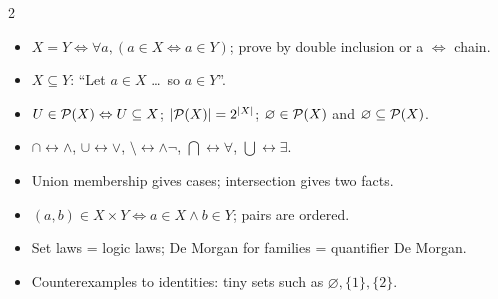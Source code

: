 
\begin{multicols}{2}\small
\begin{itemize}
\item $X=Y\Leftrightarrow\forall a,(a\in X\Leftrightarrow a\in Y)$; prove by double inclusion or a $\Leftrightarrow$ chain.
\item $X\subseteq Y$: ``Let $a\in X$ \dots\ so $a\in Y$''.
\item $U\in\mathcal{P}(X)\Leftrightarrow U\subseteq X$; $|\mathcal{P}(X)|=2^{|X|}$; $\varnothing\in\mathcal{P}(X)$ and $\varnothing\subseteq\mathcal{P}(X)$.
\item $\cap\leftrightarrow\wedge$, $\cup\leftrightarrow\vee$, $\setminus\leftrightarrow\wedge\neg$, $\bigcap\leftrightarrow\forall$, $\bigcup\leftrightarrow\exists$.
\item Union membership gives cases; intersection gives two facts.
\item $(a,b)\in X\times Y\Leftrightarrow a\in X\wedge b\in Y$; pairs are ordered.
\item Set laws = logic laws; De Morgan for families = quantifier De Morgan.
\item Counterexamples to identities: tiny sets such as $\varnothing,\{1\},\{2\}$.
\end{itemize}
\end{multicols}
